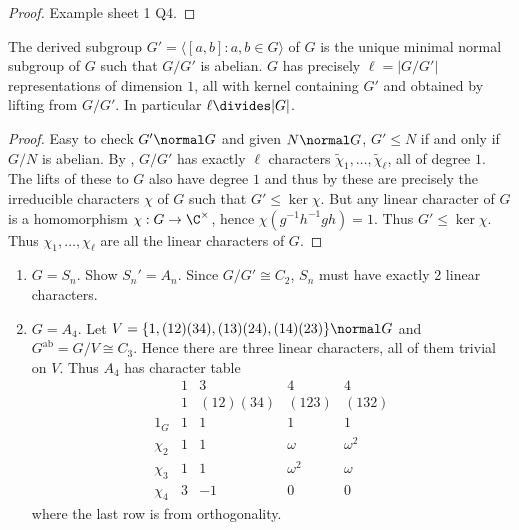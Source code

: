\documentclass[a4paper]{article}
\theoremstyle{definition}
\begin{document}
\begin{proof}
  Example sheet 1 Q4.
\end{proof}

\begin{lemma}
  The derived subgroup \(G' = \langle [a, b]: a, b \in G \rangle\) of \(G\) is the unique minimal normal subgroup of \(G\) such that \(G/G'\) is abelian. \(G\) has precisely \(\ell = |G/G'|\) representations of dimension \(1\), all with kernel containing \(G'\) and obtained by lifting from \(G/G'\). In particular \(\ell \divides |G|\).
\end{lemma}

\begin{proof}
  Easy to check \(G' \normal G\) and given \(N \normal G\), \(G' \leq N\) if and only if \(G/N\) is abelian. By , \(G/G'\) has exactly \(\ell\) characters \(\tilde \chi_1, \dots, \tilde \chi_\ell\), all of degree \(1\). The lifts of these to \(G\) also have degree \(1\) and thus by  these are precisely the irreducible characters \(\chi\) of \(G\) such that \(G' \leq \ker \chi\). But any linear character of \(G\) is a homomorphism \(\chi: G \to \C^\times\), hence \(\chi(g^{-1}h^{-1}gh) = 1\). Thus \(G' \leq \ker \chi\). Thus \(\chi_1, \dots, \chi_\ell\) are all the linear characters of \(G\).
\end{proof}

\begin{eg}\leavevmode
  \begin{enumerate}
  \item \(G = S_n\). Show \(S_n' = A_n\). Since \(G/G' \cong C_2\), \(S_n\) must have exactly 2 linear characters.
  \item \(G = A_4\). Let \(V = \{1, (12)(34), (13)(24), (14)(23)\} \normal G\) and \(G^{\text{ab}} = G/V \cong C_3\). Hence there are three linear characters, all of them trivial on \(V\). Thus \(A_4\) has character table
    \[
      \begin{array}{r|c|c|c|c}
        & 1 & 3 & 4 & 4 \\
        & 1 & (12)(34) & (123) & (132) \\ \hline
        1_G & 1 & 1 & 1 & 1 \\
        \chi_2 & 1 & 1 & \omega & \omega^2 \\
        \chi_3 & 1 & 1 & \omega^2 & \omega \\
        \chi_4 & 3 & -1 & 0 & 0
      \end{array}
    \]
    where the last row is from orthogonality.
  \end{enumerate}
\end{eg}
\end{document}
